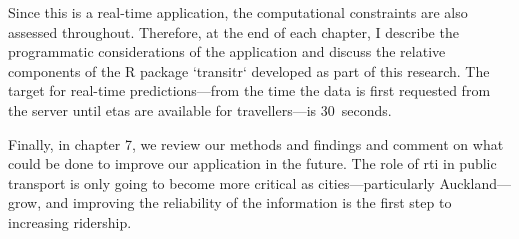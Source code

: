 Since this is a real-time application, the computational constraints are also assessed throughout. Therefore, at the end of each chapter, I describe the programmatic considerations of the application and discuss the relative components of the R package `transitr` developed as part of this research. The target for real-time predictions---from the time the data is first requested from the server until \glspl{eta} are available for travellers---is 30~seconds.


Finally, in chapter 7, we review our methods and findings and comment on what could be done to improve our application in the future. The role of \gls{rti} in public transport is only going to become more critical as cities---particularly Auckland---grow, and improving the reliability of the information is the first step to increasing ridership.

